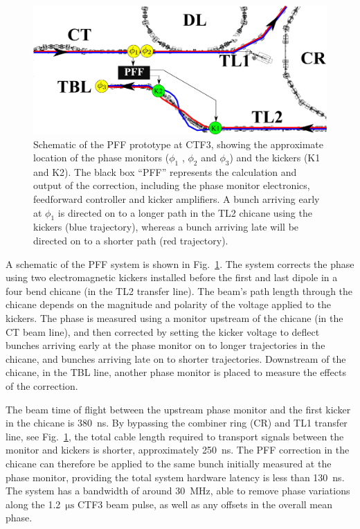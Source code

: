 \documentclass[%
 reprint,
 amsmath,amssymb,
 aps,
]{revtex4-1}
\begin{document}
\begin{figure}
	\includegraphics[width=\textwidth]{figs/ctfpffLayout}%
	\caption{\label{fig:pffLayout}Schematic of the PFF prototype at CTF3, 
	showing the approximate location of the phase monitors (\(\phi_1\) , 
	\(\phi_2\) and \(\phi_3\)) and
		the kickers (K1 and K2). The black box “PFF” represents the calculation 
		and output of the correction, including the phase monitor
		electronics, feedforward controller and kicker amplifiers. A bunch 
		arriving early at \(\phi_1\) is directed on to a longer path in the TL2 
		chicane
		using the kickers (blue trajectory), whereas a bunch arriving late will 
		be directed on to a shorter path (red trajectory).}
\end{figure}

A schematic of the PFF system is shown in Fig.~\ref{fig:pffLayout}. The system 
corrects the phase using two electromagnetic kickers installed 
before the first and last dipole in a four bend chicane (in the TL2 transfer 
line). The beam's path length 
through the chicane depends on the magnitude and polarity of the voltage 
applied to the kickers. The phase is measured using a monitor upstream of 
the chicane (in the CT beam line), and then corrected by setting the kicker 
voltage to deflect bunches arriving early at the phase monitor on to longer 
trajectories in the chicane, and bunches arriving late on to shorter 
trajectories. Downstream of the chicane, in the TBL line, another phase monitor 
is placed to measure the effects of the correction.

The beam time of flight between the upstream phase monitor and the first kicker 
in the chicane is 380~ns. By bypassing the combiner ring (CR) and TL1 transfer 
line, see Fig.~\ref{fig:pffLayout}, the total cable length required to 
transport signals between the monitor and kickers is shorter, approximately 
250~ns. The PFF correction in the chicane can therefore be applied to the same 
bunch initially measured at the phase monitor, providing the total system 
hardware latency is less than 130~ns. The system has a bandwidth of around 
30~MHz, able to remove phase variations along the 1.2~\(\mathrm{\mu s}\) CTF3 
beam 
pulse, as well as any offsets in the overall mean phase.
\end{document}
